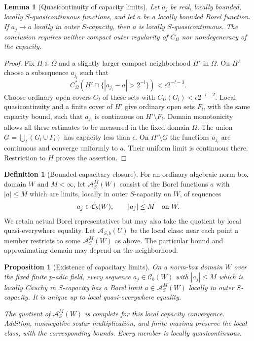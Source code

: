 \documentclass[11pt,a4paper]{article}
\numberwithin{equation}{section}
\newtheorem{lemma}[theorem]{Lemma}
\newtheorem{proposition}[theorem]{Proposition}
\theoremstyle{definition}
\newtheorem{definition}[theorem]{Definition}
\theoremstyle{remark}
\newcommand{\Cb}{\mathcal C_b}
\begin{document}
\begin{lemma}[Quasicontinuity of capacity limits]
\label{lem:r2-qc-limit}
Let $a_j$ be real, locally bounded, locally $S$-quasicontinuous
functions, and let $a$ be a locally bounded Borel function. If
$a_j\to a$ locally in outer $S$-capacity, then $a$ is locally
$S$-quasicontinuous. The conclusion requires neither compact
outer regularity of $C_\Omega$ nor nondegeneracy of the capacity.
\end{lemma}

\begin{proof}
Fix $H\Subset\Omega$ and a slightly larger compact neighborhood
$H'$ in $\Omega$. On $H'$ choose a subsequence $a_{j_l}$ such that
\[
 C_\Omega^*(H'\cap\{|a_{j_l}-a|>2^{-l}\})
       <\epsilon2^{-l-3}.
\]
Choose ordinary open covers $G_l$ of these sets with
$C_\Omega(G_l)<\epsilon2^{-l-2}$. Local quasicontinuity and a
finite cover of $H'$ give ordinary open sets $F_l$, with the same
capacity bound, such that $a_{j_l}$ is continuous on
$H'\setminus F_l$. Domain monotonicity allows all these estimates
to be measured in the fixed domain $\Omega$.
The union $G=\bigcup_l(G_l\cup F_l)$ has capacity less than
$\epsilon$. On $H'\setminus G$ the functions $a_{j_l}$ are
continuous and converge uniformly to $a$. Their uniform limit is
continuous there. Restriction to $H$ proves the assertion.
\end{proof}

\begin{definition}[Bounded capacitary closure]
\label{def:r2-capacitary-class}
For an ordinary algebraic norm-box domain $W$ and $M<\infty$,
let $\mathcal A^M_S(W)$ consist of the Borel functions $a$ with
$|a|\leq M$ which are limits, locally in outer $S$-capacity on
$W$, of sequences
\[
 a_j\in\Cb(W),\qquad |a_j|\leq M\quad\hbox{on }W.
\]
We retain actual Borel representatives but may also take the
quotient by local quasi-everywhere equality. Let
$\mathcal A_{S,b}(U)$ be the local class: near each point a member
restricts to some $\mathcal A^M_S(W)$ as above. The particular
bound and approximating domain may depend on the neighborhood.
\end{definition}

\begin{proposition}[Existence of capacitary limits]
\label{prop:r2-completion}
On a norm-box domain $W$ over the fixed finite $p$-adic field,
every sequence $a_j\in\Cb(W)$ with $|a_j|\leq M$ which is
locally Cauchy in $S$-capacity has a Borel limit
$a\in\mathcal A^M_S(W)$ locally in outer $S$-capacity. It is
unique up to local quasi-everywhere equality.

The quotient of $\mathcal A^M_S(W)$ is complete for this local
capacity convergence. Addition, nonnegative scalar multiplication,
and finite maxima preserve the local class, with the corresponding
bounds. Every member is locally quasicontinuous.
\end{proposition}
\end{document}
